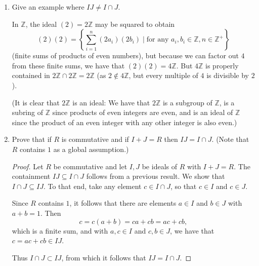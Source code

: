\documentclass[11pt]{article}
\newcommand{\cbr}[1]{\left\{#1\right\}}
\begin{document}
\begin{enumerate}
\begin{enumerate}[label=\textbf{(\alph*)}]
\begin{proof}
            For any $r\in R$, we have $r(a_1b_1 + \cdots + a_nb_n) = (ra_1)b_1 + \cdots + (ra_n)b_n \in IJ$ and $(a_1b_1 + \cdots + a_nb_n)r = a_1(b_1 r) + \cdots + a_n(b_n r)\in IJ$ since $r a_i\in I$ and $b_i r\in J$ for $1\leq i \leq n$ due to $I$ and $J$ being ideals of $R$. Hence $IJ$ is an ideal of $R$.

            With $I$ and $J$ being ideals, it follows that for any $a\in I$ and $b\in J$, the element $ab$ can be viewed as an element of $I$ and also as an element of $J$; that is, $ab\in I\cap J$. Therefore, for any element $a_1b_1 + \cdots a_nb_n\in IJ$, viewing every term as an element of $I$ yields that this element is in $I$. Similarly, view every term as an element of $J$ to see that this element is in $J$. Hence $a_1b_1 + \cdots a_nb_n\in I\cap J$, so that $IJ\subseteq I\cap J$.
        \end{proof}
        \item Give an example where $IJ\neq I\cap J$.
        
        In $\mathbb{Z}$, the ideal $(2) = 2\mathbb{Z}$ may be squared to obtain \[(2)(2) = \cbr{\sum_{i=1}^n (2a_i)(2b_i) \mid \text{for any } a_i,b_i\in \mathbb{Z}, n\in \mathbb{Z}^+}\] (finite sums of products of even numbers), but because we can factor out $4$ from these finite sums, we have that $(2)(2) = 4\mathbb{Z}$. But $4\mathbb{Z}$ is properly contained in $2\mathbb{Z}\cap 2\mathbb{Z} = 2\mathbb{Z}$ (as $2\not\in 4\mathbb{Z}$, but every multiple of $4$ is divisible by $2$). 

        (It is clear that $2\mathbb{Z}$ is an ideal: We have that $2\mathbb{Z}$ is a subgroup of $\mathbb{Z}$, is a subring of $\mathbb{Z}$ since products of even integers are even, and is an ideal of $\mathbb{Z}$ since the product of an even integer with any other integer is also even.) 
        \item Prove that if $R$ is commutative and if $I+J = R$ then $IJ = I\cap J$. (Note that $R$ contains $1$ as a global assumption.)
        \begin{proof}
            Let $R$ be commutative and let $I,J$ be ideals of $R$ with $I+J = R$. The containment $IJ\subseteq I\cap J$ follows from a previous result. We show that $I\cap J\subseteq IJ$. To that end, take any element $c\in I\cap J$, so that $c\in I$ and $c\in J$.
            
            Since $R$ contains $1$, it follows that there are elements $a\in I$ and $b\in J$ with $a+b = 1$. Then \[c = c(a+b) = ca + cb = ac + cb,\] which is a finite sum, and with $a,c\in I$ and $c,b\in J$, we have that $c = ac+cb\in IJ$.
            
            Thus $I\cap J\subset IJ$, from which it follows that $IJ = I\cap J$.
        \end{proof}
    \end{enumerate}
\end{enumerate}
\end{document}
